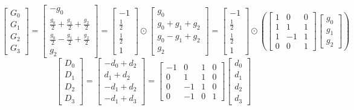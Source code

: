 \documentclass{article}%
\begin{document}
\[%
\left[\begin{matrix}G_{0}\\G_{1}\\G_{2}\\G_{3}\end{matrix}\right] = \left[\begin{matrix}- g_{0}\\\frac{g_{0}}{2} + \frac{g_{1}}{2} + \frac{g_{2}}{2}\\\frac{g_{0}}{2} - \frac{g_{1}}{2} + \frac{g_{2}}{2}\\g_{2}\end{matrix}\right] = \left[\begin{matrix}-1\\\frac{1}{2}\\\frac{1}{2}\\1\end{matrix}\right] \odot \left[\begin{matrix}g_{0}\\g_{0} + g_{1} + g_{2}\\g_{0} - g_{1} + g_{2}\\g_{2}\end{matrix}\right] = \left[\begin{matrix}-1\\\frac{1}{2}\\\frac{1}{2}\\1\end{matrix}\right] \odot \left( \left[\begin{matrix}1 & 0 & 0\\1 & 1 & 1\\1 & -1 & 1\\0 & 0 & 1\end{matrix}\right] \left[\begin{matrix}g_{0}\\g_{1}\\g_{2}\end{matrix}\right] \right)%
\]%
\[%
\left[\begin{matrix}D_{0}\\D_{1}\\D_{2}\\D_{3}\end{matrix}\right] = \left[\begin{matrix}- d_{0} + d_{2}\\d_{1} + d_{2}\\- d_{1} + d_{2}\\- d_{1} + d_{3}\end{matrix}\right] = \left[\begin{matrix}-1 & 0 & 1 & 0\\0 & 1 & 1 & 0\\0 & -1 & 1 & 0\\0 & -1 & 0 & 1\end{matrix}\right] \left[\begin{matrix}d_{0}\\d_{1}\\d_{2}\\d_{3}\end{matrix}\right]%
\]%
\end{document}
